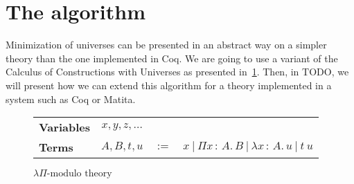 \documentclass{article}
\newcommand{\lfmt}{\ensuremath{\lambda\Pi\text{-modulo theory}}}
\newcommand{\defn}{\ensuremath{:=}}
\newcommand{\tabs}[3]{\ensuremath{\lambda{#1}\,{:}\,{#2}.\,{#3}}}
\newcommand{\tapp}[2]{\ensuremath{{#1}~{#2}}}
\newcommand{\tpi}[3]{\ensuremath{\Pi{#1}\,{:}\,{#2}.\,{#3}}}
\newcommand{\universo}{\textsc{Universo}}
\begin{document}
\section{The algorithm}
\label{sec:algo}
Minimization of universes can be presented in an abstract way on a simpler theory than the one implemented in Coq. We are going to use a variant of the Calculus of Constructions with Universes as presented in~\ref{fig:sttsyntax}. Then, in TODO, we will present how we can extend this algorithm for a theory implemented in a system such as Coq or Matita.

\begin{figure}
  \centering
  \begin{tabular}{lccl}
    \textbf{Variables} & \(x,y,z,\dots\) & & \\
    \textbf{Terms} & \(A,B,t,u\) & \(\defn\) & \(x~|~\tpi{x}{A}{B} ~|~\tabs{x}{A}{u} ~|~ \tapp{t}{u} \)\\

  \end{tabular}
  \caption{\lfmt{}}
  \label{fig:sttsyntax}
\end{figure}


\end{document}
